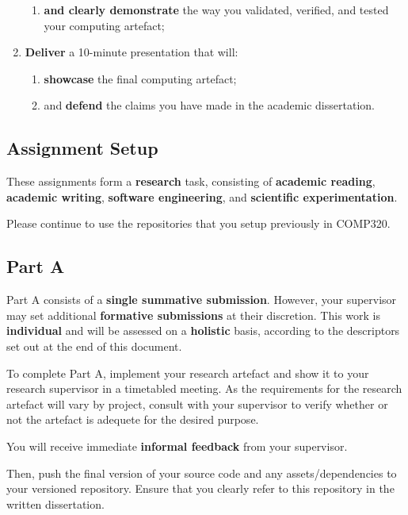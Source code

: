 \begin{enumerate}[label=(\Alph*)]
\begin{enumerate}[label=(\roman*)]
			\item \textbf{and clearly demonstrate} the way you validated, verified, and tested your computing artefact;
		\end{enumerate}
	\item \textbf{Deliver} a 10-minute presentation that will:
		\begin{enumerate}[label=(\roman*)]
			\item \textbf{showcase} the final computing artefact;
			\item and \textbf{defend} the claims you have made in the academic dissertation.
		\end{enumerate}
\end{enumerate}

\subsection*{Assignment Setup}

These assignments form a \textbf{research} task, consisting of \textbf{academic reading}, \textbf{academic writing},
\textbf{software engineering}, and \textbf{scientific experimentation}.

Please continue to use the repositories that you setup previously in COMP320.

\subsection*{Part A}

Part A consists of a \textbf{single summative submission}.
However, your supervisor may set additional \textbf{formative submissions} at their discretion.
This work is \textbf{individual} and will be assessed on a \textbf{holistic} basis, according to the descriptors set out at the end of this document.

To complete Part A, implement your research artefact and show it to your research supervisor in a timetabled meeting. As
the requirements for the research artefact will vary by project, consult with your supervisor to verify whether or not the
artefact is adequete for the desired purpose.

You will receive immediate \textbf{informal feedback} from your supervisor.

Then, push the final version of your source code and any assets/dependencies to your versioned repository. Ensure that you clearly refer to this repository in the written dissertation.


